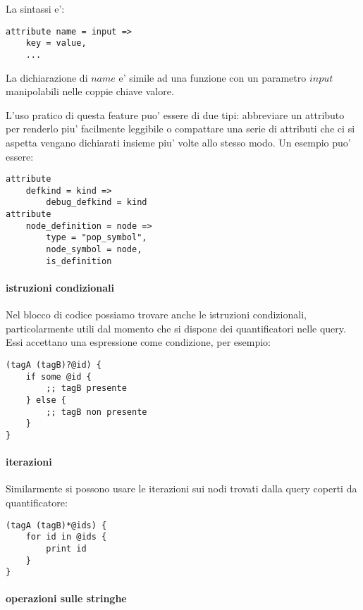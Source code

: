 La sintassi e':

\begin{verbatim}
attribute name = input =>
    key = value,
    ...
\end{verbatim}

La dichiarazione di $name$ e' simile ad una funzione con un parametro $input$ manipolabili nelle coppie chiave valore.

L'uso pratico di questa feature puo' essere di due tipi: abbreviare un attributo per renderlo piu' facilmente leggibile o compattare una serie di attributi che ci si aspetta vengano dichiarati insieme piu' volte allo stesso modo. Un esempio puo' essere:

\begin{verbatim}
attribute
    defkind = kind =>
        debug_defkind = kind
attribute
    node_definition = node =>
        type = "pop_symbol",
        node_symbol = node,
        is_definition
\end{verbatim}

\paragraph{istruzioni condizionali}

Nel blocco di codice possiamo trovare anche le istruzioni condizionali, particolarmente utili dal momento che si dispone dei quantificatori nelle query.
Essi accettano una espressione come condizione, per esempio:

\begin{verbatim}
(tagA (tagB)?@id) {
    if some @id {
        ;; tagB presente
    } else {
        ;; tagB non presente
    }
}
\end{verbatim}

\paragraph{iterazioni}

Similarmente si possono usare le iterazioni sui nodi trovati dalla query coperti da quantificatore:

\begin{verbatim}
(tagA (tagB)*@ids) {
    for id in @ids {
        print id
    }
}
\end{verbatim}

\paragraph{operazioni sulle stringhe}

